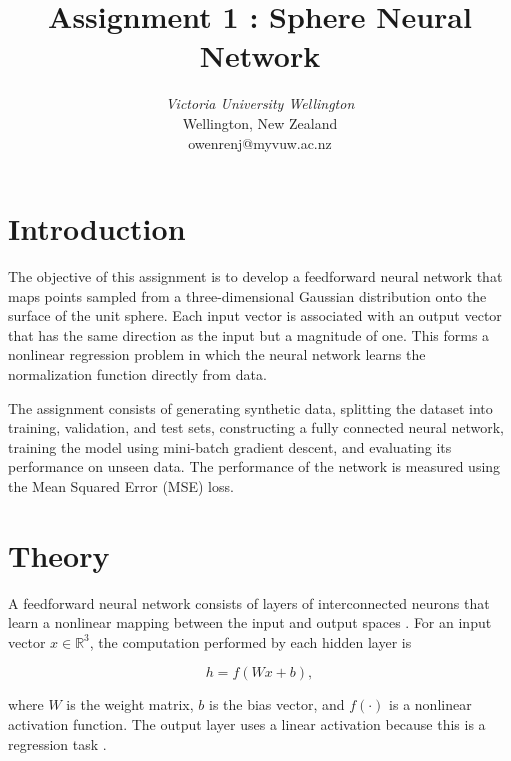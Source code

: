 \documentclass[conference,a4paper]{IEEEtran}
\begin{document}
\title{Assignment 1 : Sphere Neural Network %
}

\author{
\textit{Victoria University Wellington}\\
Wellington, New Zealand\\
owenrenj@myvuw.ac.nz}

\maketitle

\section{Introduction}

The objective of this assignment is to develop a feedforward neural network that maps points sampled from a three-dimensional Gaussian distribution onto the surface of the unit sphere. Each input vector is associated with an output vector that has the same direction as the input but a magnitude of one. This forms a nonlinear regression problem in which the neural network learns the normalization function directly from data.

The assignment consists of generating synthetic data, splitting the dataset into training, validation, and test sets, constructing a fully connected neural network, training the model using mini-batch gradient descent, and evaluating its performance on unseen data. The performance of the network is measured using the Mean Squared Error (MSE) loss.

\section{Theory}

A feedforward neural network consists of layers of interconnected neurons that learn a nonlinear mapping between the input and output spaces \cite{goodfellow2016,haykin2009}. For an input vector $x \in \mathbb{R}^3$, the computation performed by each hidden layer is

\begin{equation}
	h = f(Wx+b),
\end{equation}

where $W$ is the weight matrix, $b$ is the bias vector, and $f(\cdot)$ is a nonlinear activation function. The output layer uses a linear activation because this is a regression task \cite{goodfellow2016}.
\end{document}
